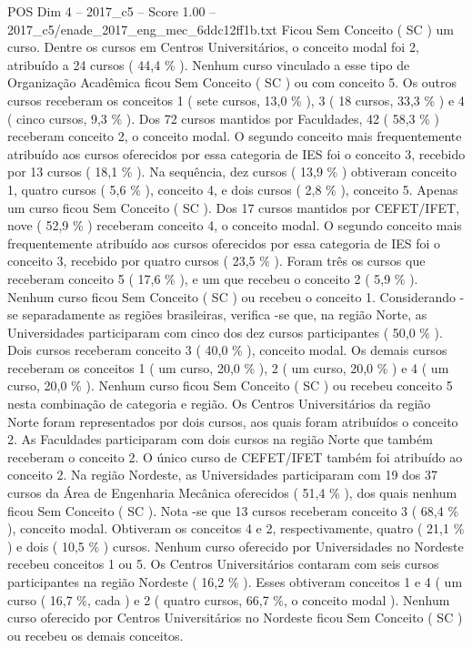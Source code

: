 \begin{textsample}{POS Dim 4 – 2017\_c5 – Score 1.00 – 2017\_c5/enade\_2017\_eng\_mec\_6ddc12ff1b.txt}
Ficou Sem Conceito ( SC ) um curso.
Dentre os cursos em Centros Universitários, o conceito modal foi 2, atribuído a 24 cursos ( 44,4 \% ).
Nenhum curso vinculado a esse tipo de Organização Acadêmica ficou Sem Conceito ( SC ) ou com conceito 5.
Os outros cursos receberam os conceitos 1 ( sete cursos, 13,0 \% ), 3 ( 18 cursos, 33,3 \% ) e 4 ( cinco cursos, 9,3 \% ).
Dos 72 cursos mantidos por Faculdades, 42 ( 58,3 \% ) receberam conceito 2, o conceito modal.
O segundo conceito mais frequentemente atribuído aos cursos oferecidos por essa categoria de IES foi o conceito 3, recebido por 13 cursos ( 18,1 \% ).
Na sequência, dez cursos ( 13,9 \% ) obtiveram conceito 1, quatro cursos ( 5,6 \% ), conceito 4, e dois cursos ( 2,8 \% ), conceito 5.
Apenas um curso ficou Sem Conceito ( SC ).
Dos 17 cursos mantidos por CEFET/IFET, nove ( 52,9 \% ) receberam conceito 4, o conceito modal.
O segundo conceito mais frequentemente atribuído aos cursos oferecidos por essa categoria de IES foi o conceito 3, recebido por quatro cursos ( 23,5 \% ).
Foram três os cursos que receberam conceito 5 ( 17,6 \% ), e um que recebeu o conceito 2 ( 5,9 \% ).
Nenhum curso ficou Sem Conceito ( SC ) ou recebeu o conceito 1.
Considerando -se separadamente as regiões brasileiras, verifica -se que, na região Norte, as Universidades participaram com cinco dos dez cursos participantes ( 50,0 \% ).
Dois cursos receberam conceito 3 ( 40,0 \% ), conceito modal.
Os demais cursos receberam os conceitos 1 ( um curso, 20,0 \% ), 2 ( um curso, 20,0 \% ) e 4 ( um curso, 20,0 \% ).
Nenhum curso ficou Sem Conceito ( SC ) ou recebeu conceito 5 nesta combinação de categoria e região.
Os Centros Universitários da região Norte foram representados por dois cursos, aos quais foram atribuídos o conceito 2.
As Faculdades participaram com dois cursos na região Norte que também receberam o conceito 2.
O único curso de CEFET/IFET também foi atribuído ao conceito 2.
Na região Nordeste, as Universidades participaram com 19 dos 37 cursos da Área de Engenharia Mecânica oferecidos ( 51,4 \% ), dos quais nenhum ficou Sem Conceito ( SC ).
Nota -se que 13 cursos receberam conceito 3 ( 68,4 \% ), conceito modal.
Obtiveram os conceitos 4 e 2, respectivamente, quatro ( 21,1 \% ) e dois ( 10,5 \% ) cursos.
Nenhum curso oferecido por Universidades no Nordeste recebeu conceitos 1 ou 5.
Os Centros Universitários contaram com seis cursos participantes na região Nordeste ( 16,2 \% ).
Esses obtiveram conceitos 1 e 4 ( um curso ( 16,7 \%, cada ) e 2 ( quatro cursos, 66,7 \%, o conceito modal ).
Nenhum curso oferecido por Centros Universitários no Nordeste ficou Sem Conceito ( SC ) ou recebeu os demais conceitos.

\end{textsample}

